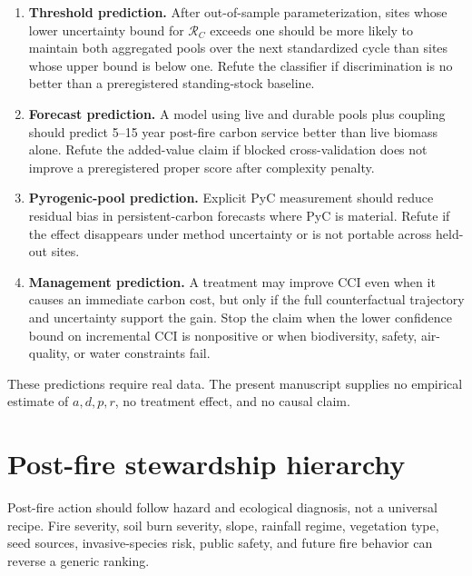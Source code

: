 \documentclass[10pt]{article}
\newcommand{\RC}{\mathcal{R}_{\!C}}
\begin{document}
\begin{enumerate}
\item \textbf{Threshold prediction.}  After out-of-sample parameterization,
sites whose lower uncertainty bound for $\RC$ exceeds one should be more likely
to maintain both aggregated pools over the next standardized cycle than sites
whose upper bound is below one.  Refute the classifier if discrimination is no
better than a preregistered standing-stock baseline.
\item \textbf{Forecast prediction.}  A model using live and durable pools plus
coupling should predict 5--15 year post-fire carbon service better than live
biomass alone.  Refute the added-value claim if blocked cross-validation does
not improve a preregistered proper score after complexity penalty.
\item \textbf{Pyrogenic-pool prediction.}  Explicit PyC measurement should
reduce residual bias in persistent-carbon forecasts where PyC is material.
Refute if the effect disappears under method uncertainty or is not portable
across held-out sites.
\item \textbf{Management prediction.}  A treatment may improve CCI even when it
causes an immediate carbon cost, but only if the full counterfactual trajectory
and uncertainty support the gain.  Stop the claim when the lower confidence
bound on incremental CCI is nonpositive or when biodiversity, safety, air-
quality, or water constraints fail.
\end{enumerate}

These predictions require real data.  The present manuscript supplies no
empirical estimate of $a,d,p,r$, no treatment effect, and no causal claim.

\section{Post-fire stewardship hierarchy}

Post-fire action should follow hazard and ecological diagnosis, not a universal
recipe.  Fire severity, soil burn severity, slope, rainfall regime, vegetation
type, seed sources, invasive-species risk, public safety, and future fire
behavior can reverse a generic ranking.
\end{document}
